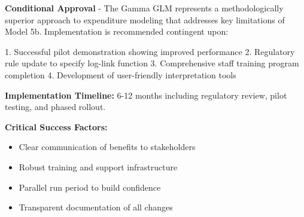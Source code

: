 \textbf{Conditional Approval} - The Gamma GLM represents a methodologically superior approach to expenditure modeling that addresses key limitations of Model 5b. Implementation is recommended contingent upon:

1. Successful pilot demonstration showing improved performance
2. Regulatory rule update to specify log-link function
3. Comprehensive staff training program completion
4. Development of user-friendly interpretation tools

\textbf{Implementation Timeline:} 6-12 months including regulatory review, pilot testing, and phased rollout.

\textbf{Critical Success Factors:}
\begin{itemize}
    \item Clear communication of benefits to stakeholders
    \item Robust training and support infrastructure
    \item Parallel run period to build confidence
    \item Transparent documentation of all changes
\end{itemize}
